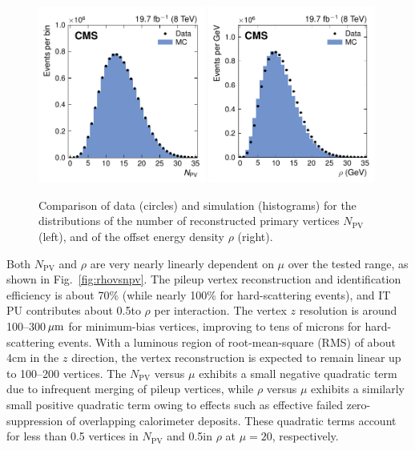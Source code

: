 \documentclass[11pt,twoside,a4paper,cmspaper,final,collab]{cms-tdr}
\begin{document}
\begin{figure}[htbp!]
\centering
\includegraphics[width=0.49\textwidth]{Figure_003-a.pdf}
\includegraphics[width=0.49\textwidth]{Figure_003-b.pdf}
\caption{\label{fig:rhoandnpv}
Comparison of data (circles) and  simulation (histograms) for the distributions of the number of reconstructed primary vertices $N_\mathrm{PV}$ (left), and of the offset energy density $\rho$ (right).
}
\end{figure}

Both $N_\mathrm{PV}$ and $\rho$ are very nearly linearly dependent on $\mu$ over the tested range, as shown in Fig.~\ref{fig:rhovsnpv}.
The pileup vertex reconstruction and identification efficiency is about 70\% (while nearly 100\% for hard-scattering events), and IT PU contributes about 0.5\GeV to $\rho$ per interaction.
The vertex $z$ resolution is around 100--300$\,\mu\text{m}$ for minimum-bias vertices, improving to tens of microns for hard-scattering events. With a luminous region of root-mean-square (RMS) of about 4\unit{cm} in the $z$ direction, the vertex reconstruction is expected to remain linear up to 100--200 vertices.
The $N_\mathrm{PV}$ versus $\mu$ exhibits a small negative quadratic term due to infrequent merging of pileup vertices, while $\rho$ versus $\mu$ exhibits a similarly small positive quadratic term owing to effects such as effective failed zero-suppression of overlapping calorimeter deposits.
These quadratic terms account for less than 0.5 vertices in $N_\mathrm{PV}$ and 0.5\GeV in $\rho$ at $\mu=20$, respectively.
\end{document}
